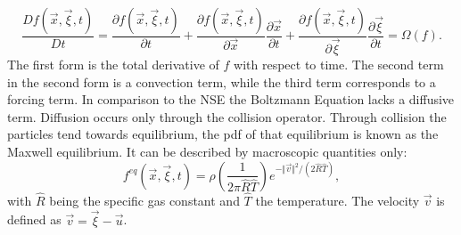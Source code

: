 \begin{equation}
	\frac{D f(\vec{x}, \vec{\xi}, t)}{Dt} = \frac{ \partial f(\vec{x}, \vec{\xi}, t)}{\partial t} + \frac{ \partial f(\vec{x}, \vec{\xi}, t)}{\partial\vec{x}} \frac{\partial \vec{x}}{\partial t} + \frac{ \partial f(\vec{x}, \vec{\xi}, t)}{\partial \vec{\xi}} \frac{\partial \vec{\xi}}{\partial t} =  \Omega(f). \label{eq:boltzmann}
\end{equation}
 The first form is the total derivative of $f$ with respect to time. The second term in the second form is a convection term, while the third term corresponds to a forcing term. In comparison to the NSE the Boltzmann Equation lacks a diffusive term. Diffusion occurs only through the collision operator. Through collision the particles tend towards equilibrium, the pdf of that equilibrium is known as the Maxwell equilibrium. It can be described by macroscopic quantities only:
\begin{equation}
	f^{eq} (\vec{x}, \vec{\xi}, t) = \rho\left(\frac{1}{2 \pi \hat{R}\hat{T}}\right) e^{-\Vert \vec{v} \Vert^2/(2\hat{R}\hat{T}) }, \label{eq:equilibrium}
\end{equation}
with $\hat{R}$ being the specific gas constant and $\hat{T}$ the temperature. The velocity $\vec{v}$ is defined as $\vec{v} = \vec{\xi}-\vec{u}$. \cite[p. 15- 21]{kruger_lattice_2017} \\
